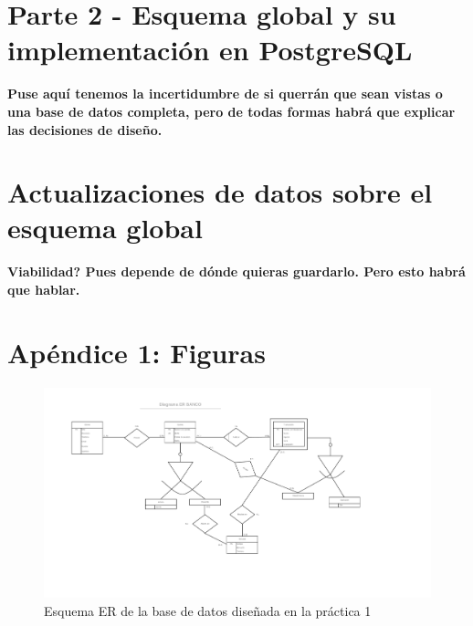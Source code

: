 \documentclass{article}
\begin{document}
\section{Parte 2 - Esquema global y su implementación en PostgreSQL}

\textbf{Puse aquí tenemos la incertidumbre de si querrán que sean vistas o una base de datos completa, pero de todas formas habrá que explicar las decisiones de diseño.}

\section{Actualizaciones de datos sobre el esquema global}

\textbf{Viabilidad? Pues depende de dónde quieras guardarlo. Pero esto habrá que hablar.}

\newpage
\section{Apéndice 1: Figuras}

\begin{landscape}
\begin{figure}
\centering
\includegraphics[scale=0.75]{images/er_practica1.png}
\caption{Esquema ER de la base de datos diseñada en la práctica 1}
\label{fig:er1}
\end{figure}
\end{landscape}
\end{document}

